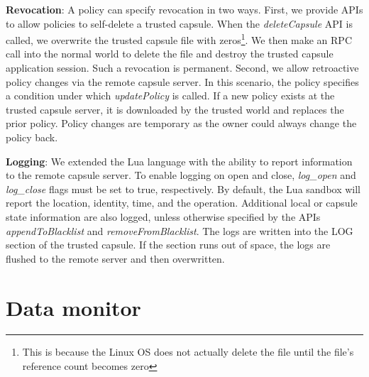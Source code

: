 \textbf{Revocation}: A policy can specify revocation in two
ways. First, we provide APIs to allow policies to self-delete a trusted
capsule. When the \textit{deleteCapsule} API is called, we overwrite
the trusted capsule file with zeros\footnote{This is because the Linux OS does not
    actually delete the file until the file's reference count becomes zero}. We then
make an RPC call into the normal world to delete the file and destroy the
trusted capsule application session. Such a revocation is permanent.  Second, we
allow retroactive policy changes via the remote capsule server. In this
scenario, the policy specifies a condition under which \textit{updatePolicy} is
called. If a new policy exists at the trusted capsule server, it is downloaded
by the trusted world and replaces the prior policy. Policy changes are temporary as the owner
could always change the policy back. %

\textbf{Logging}: We extended the Lua language with the ability to report
information to the remote capsule server. To enable logging on open and close, \textit{log\_open}
and \textit{log\_close} flags must be set to true, respectively.
By default, the Lua sandbox will report the location,
identity, time, and the operation. Additional local or capsule state information are
also logged, unless otherwise specified by the APIs \textit{appendToBlacklist}
and \textit{removeFromBlacklist}. The logs are written into the LOG section of
the trusted capsule.  If the section runs out of space, the logs are flushed to
the remote server and then overwritten. %


\section{Data monitor}

